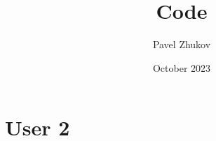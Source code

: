 \documentclass{article}
\title{Code}
\author{Pavel Zhukov}
\date{October 2023}
\begin{document}
\maketitle




\section{User 2}
\end{document}
